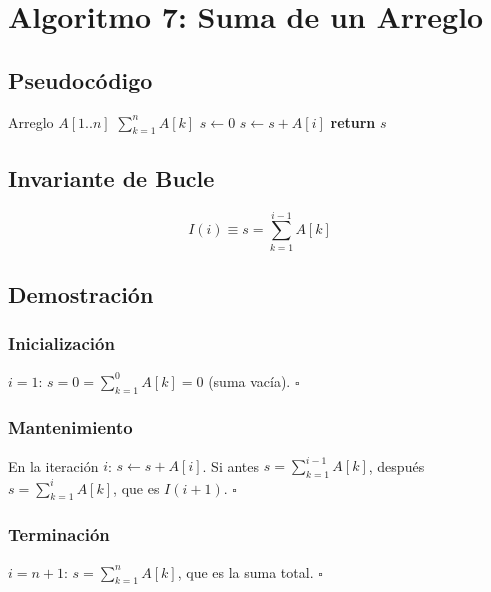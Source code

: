\documentclass[11pt,a4paper]{article}
\newcommand{\inv}{I}
\begin{document}
\newpage

\section{Algoritmo 7: Suma de un Arreglo}

\subsection{Pseudocódigo}
\begin{algorithm}[H]
\caption{Suma de Arreglo}
\begin{algorithmic}[1]
\Require Arreglo $A[1..n]$
\Ensure $\sum_{k=1}^{n} A[k]$
\State $s \gets 0$
    \State $s \gets s + A[i]$
\EndFor
\State \textbf{return} $s$
\end{algorithmic}
\end{algorithm}

\subsection{Invariante de Bucle}
\[
\boxed{\inv(i) \equiv s = \sum_{k=1}^{i-1} A[k]}
\]

\subsection{Demostración}

\subsubsection{Inicialización}
$i = 1$: $s = 0 = \sum_{k=1}^{0} A[k] = 0$ (suma vacía). $\square$

\subsubsection{Mantenimiento}
En la iteración $i$: $s \gets s + A[i]$. Si antes $s = \sum_{k=1}^{i-1} A[k]$, después $s = \sum_{k=1}^{i} A[k]$, que es $\inv(i+1)$. $\square$

\subsubsection{Terminación}
$i = n+1$: $s = \sum_{k=1}^{n} A[k]$, que es la suma total. $\square$
\end{document}
